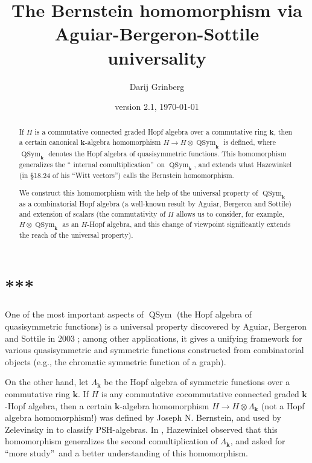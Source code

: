 \documentclass[numbers=enddot,12pt,final,onecolumn,notitlepage,abstracton]{scrartcl}%
\theoremstyle{definition}
\begin{document}
\title{The Bernstein homomorphism via Aguiar-Bergeron-Sottile universality}
\author{Darij Grinberg}
\date{version 2.1, {\today}}
\maketitle

\begin{abstract}
If $H$ is a commutative connected graded Hopf algebra over a commutative ring
$\mathbf{k}$, then a certain canonical $\mathbf{k}$-algebra homomorphism
$H\rightarrow H\otimes\operatorname*{QSym}\nolimits_{\mathbf{k}}$ is defined,
where $\operatorname*{QSym}\nolimits_{\mathbf{k}}$ denotes the Hopf algebra of
quasisymmetric functions. This homomorphism generalizes the \textquotedblleft
internal comultiplication\textquotedblright\ on $\operatorname*{QSym}%
\nolimits_{\mathbf{k}}$, and extends what Hazewinkel (in \S 18.24 of his
\textquotedblleft Witt vectors\textquotedblright) calls the Bernstein homomorphism.

We construct this homomorphism with the help of the universal property of
$\operatorname*{QSym}\nolimits_{\mathbf{k}}$ as a combinatorial Hopf algebra
(a well-known result by Aguiar, Bergeron and Sottile) and extension of scalars
(the commutativity of $H$ allows us to consider, for example, $H\otimes
\operatorname*{QSym}\nolimits_{\mathbf{k}}$ as an $H$-Hopf algebra, and this
change of viewpoint significantly extends the reach of the universal property).

\end{abstract}
\tableofcontents

\section*{***}

One of the most important aspects of $\operatorname*{QSym}$ (the Hopf algebra
of quasisymmetric functions) is a universal property discovered by Aguiar,
Bergeron and Sottile in 2003 \cite{ABS}; among other applications, it gives a
unifying framework for various quasisymmetric and symmetric functions
constructed from combinatorial objects (e.g., the chromatic symmetric function
of a graph).

On the other hand, let $\Lambda_{\mathbf{k}}$ be the Hopf algebra of symmetric
functions over a commutative ring $\mathbf{k}$. If $H$ is any commutative
cocommutative connected graded $\mathbf{k}$-Hopf algebra, then a certain
$\mathbf{k}$-algebra homomorphism $H\rightarrow H\otimes\Lambda_{\mathbf{k}}$
(not a Hopf algebra homomorphism!) was defined by Joseph N. Bernstein, and
used by Zelevinsky in \cite[\S 5.2]{Zelevi81} to classify PSH-algebras. In
\cite[\S 18.24]{HazeWitt}, Hazewinkel observed that this homomorphism
generalizes the second comultiplication of $\Lambda_{\mathbf{k}}$, and asked
for \textquotedblleft more study\textquotedblright\ and a better understanding
of this homomorphism.
\end{document}
